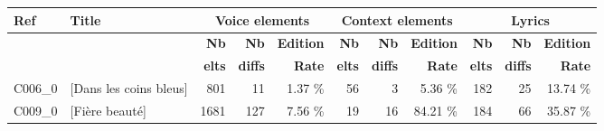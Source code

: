 \begin{small}
\begin{tabular}{l|l|r|r|r|r|r|r|r|r|r}
\textbf{Ref}& \textbf{Title} & \multicolumn{3}{c|}{\textbf{Voice elements}}  & \multicolumn{3}{c|}{\textbf{Context elements}} & \multicolumn{3}{c}{\textbf{Lyrics}}\\ 
\hline
 &  & \textbf{Nb} &  \textbf{Nb}  & \textbf{Edition} & \textbf{Nb} &  \textbf{Nb}  & \textbf{Edition}& \textbf{Nb} &  \textbf{Nb}  & \textbf{Edition} \\ 
 &  & \textbf{elts} &  \textbf{diffs} & \textbf{Rate} & \textbf{elts} &  \textbf{diffs} & \textbf{Rate} & \textbf{elts} &  \textbf{diffs} & \textbf{Rate} \\ \hline
C006\_0 & [Dans les coins bleus] & 801 & 11 & 1.37 \%& 56 & 3 & 5.36 \%& 182 & 25 & 13.74 \% \\ 
 C009\_0 & [Fière beauté] & 1681 & 127 & 7.56 \%& 19 & 16 & 84.21 \%& 184 & 66 & 35.87 \% \\ 
 \hline
\end{tabular}
\end{small}
	